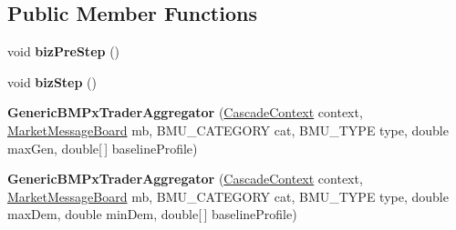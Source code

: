 \subsection*{Public Member Functions}
\begin{DoxyCompactItemize}
\item 
\hypertarget{classuk_1_1ac_1_1dmu_1_1iesd_1_1cascade_1_1agents_1_1aggregators_1_1_generic_b_m_px_trader_aggregator_ae80d0dbe8e63ef0d21fda07e645f5de2}{void {\bfseries biz\-Pre\-Step} ()}\label{classuk_1_1ac_1_1dmu_1_1iesd_1_1cascade_1_1agents_1_1aggregators_1_1_generic_b_m_px_trader_aggregator_ae80d0dbe8e63ef0d21fda07e645f5de2}

\item 
\hypertarget{classuk_1_1ac_1_1dmu_1_1iesd_1_1cascade_1_1agents_1_1aggregators_1_1_generic_b_m_px_trader_aggregator_a60680d8aee4d8558d5dc20507374f359}{void {\bfseries biz\-Step} ()}\label{classuk_1_1ac_1_1dmu_1_1iesd_1_1cascade_1_1agents_1_1aggregators_1_1_generic_b_m_px_trader_aggregator_a60680d8aee4d8558d5dc20507374f359}

\item 
\hypertarget{classuk_1_1ac_1_1dmu_1_1iesd_1_1cascade_1_1agents_1_1aggregators_1_1_generic_b_m_px_trader_aggregator_a0fef2797dd4d962dcdf0fa2e05802983}{{\bfseries Generic\-B\-M\-Px\-Trader\-Aggregator} (\hyperlink{classuk_1_1ac_1_1dmu_1_1iesd_1_1cascade_1_1context_1_1_cascade_context}{Cascade\-Context} context, \hyperlink{classuk_1_1ac_1_1dmu_1_1iesd_1_1cascade_1_1market_1_1astem_1_1operators_1_1_market_message_board}{Market\-Message\-Board} mb, B\-M\-U\-\_\-\-C\-A\-T\-E\-G\-O\-R\-Y cat, B\-M\-U\-\_\-\-T\-Y\-P\-E type, double max\-Gen, double\mbox{[}$\,$\mbox{]} baseline\-Profile)}\label{classuk_1_1ac_1_1dmu_1_1iesd_1_1cascade_1_1agents_1_1aggregators_1_1_generic_b_m_px_trader_aggregator_a0fef2797dd4d962dcdf0fa2e05802983}

\item 
\hypertarget{classuk_1_1ac_1_1dmu_1_1iesd_1_1cascade_1_1agents_1_1aggregators_1_1_generic_b_m_px_trader_aggregator_a0770bbb120519c9e52747e0e724a8a11}{{\bfseries Generic\-B\-M\-Px\-Trader\-Aggregator} (\hyperlink{classuk_1_1ac_1_1dmu_1_1iesd_1_1cascade_1_1context_1_1_cascade_context}{Cascade\-Context} context, \hyperlink{classuk_1_1ac_1_1dmu_1_1iesd_1_1cascade_1_1market_1_1astem_1_1operators_1_1_market_message_board}{Market\-Message\-Board} mb, B\-M\-U\-\_\-\-C\-A\-T\-E\-G\-O\-R\-Y cat, B\-M\-U\-\_\-\-T\-Y\-P\-E type, double max\-Dem, double min\-Dem, double\mbox{[}$\,$\mbox{]} baseline\-Profile)}\label{classuk_1_1ac_1_1dmu_1_1iesd_1_1cascade_1_1agents_1_1aggregators_1_1_generic_b_m_px_trader_aggregator_a0770bbb120519c9e52747e0e724a8a11}

\end{DoxyCompactItemize}
